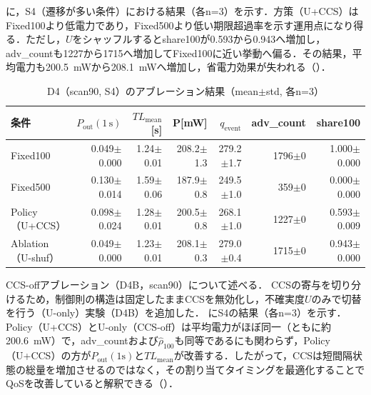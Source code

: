 に，S4（遷移が多い条件）における結果（各n=3）を示す．方策（U+CCS）はFixed100より低電力であり，Fixed500より低い期限超過率を示す運用点になり得る．ただし，$U$をシャッフルするとshare100が0.593から0.943へ増加し，adv\_countも1227から1715へ増加してFixed100に近い挙動へ偏る．その結果，平均電力も\SI{200.5}{\milli\watt}から\SI{208.1}{\milli\watt}へ増加し，省電力効果が失われる（）．

\begin{table}[tb]
  \centering
  \caption{D4（scan90, S4）のアブレーション結果（mean$\pm$std, 各n=3）}
  \label{tab:d4_summary}
  {\small
  \setlength{\tabcolsep}{4pt}
  \begin{tabular}{lrrrrrr}
    \toprule
    条件 & $P_{\mathrm{out}}(1\,\mathrm{s})$ & $TL_{\mathrm{mean}}$[s] & P[mW] & $q_{\mathrm{event}}$ & adv\_count & share100 \\
    \midrule
    Fixed100 & 0.049$\pm$0.000 & 1.24$\pm$0.01 & 208.2$\pm$1.3 & 279.2$\pm$1.7 & 1796$\pm$0 & 1.000$\pm$0.000 \\
    Fixed500 & 0.130$\pm$0.014 & 1.59$\pm$0.06 & 187.9$\pm$0.8 & 249.5$\pm$1.0 & 359$\pm$0 & 0.000$\pm$0.000 \\
    \shortstack{Policy\\（U+CCS）} & 0.098$\pm$0.024 & 1.28$\pm$0.01 & 200.5$\pm$0.8 & 268.1$\pm$1.0 & 1227$\pm$0 & 0.593$\pm$0.009 \\
    \shortstack{Ablation\\（U-shuf）} & 0.049$\pm$0.000 & 1.23$\pm$0.01 & 208.1$\pm$0.3 & 279.0$\pm$0.4 & 1715$\pm$0 & 0.943$\pm$0.000 \\
    \bottomrule
  \end{tabular}
  }
\end{table}
\noindent CCS-offアブレーション（D4B，scan90）について述べる．
\label{sec:d4b_ccs_off}
CCSの寄与を切り分けるため，制御則の構造は固定したままCCSを無効化し，不確実度$U$のみで切替を行う（U-only）実験（D4B）を追加した．
にS4の結果（各n=3）を示す．Policy（U+CCS）とU-only（CCS-off）は平均電力がほぼ同一（ともに約\SI{200.6}{\milli\watt}）で，adv\_countおよび$\hat{\rho}_{100}$も同等であるにも関わらず，Policy（U+CCS）の方が$P_{\mathrm{out}}(1\mathrm{s})$と$TL_{\mathrm{mean}}$が改善する．したがって，CCSは短間隔状態の総量を増加させるのではなく，その割り当てタイミングを最適化することでQoSを改善していると解釈できる（）．

